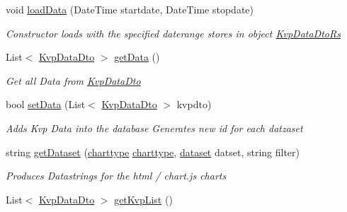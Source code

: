 \begin{DoxyCompactItemize}
void \hyperlink{classkpi_mvc_api_1_1_data_transfer_objects_1_1_kvp_data_dto_rs_afbda5e8db6a5f8b25125d2a6b6dcf7e1}{load\+Data} (Date\+Time startdate, Date\+Time stopdate)
\begin{DoxyCompactList}\small\item\em Constructor loads with the specified daterange stores in object {\ttfamily \hyperlink{classkpi_mvc_api_1_1_data_transfer_objects_1_1_kvp_data_dto_rs}{Kvp\+Data\+Dto\+Rs}} \end{DoxyCompactList}\item 
List$<$ \hyperlink{classkpi_mvc_api_1_1_data_transfer_objects_1_1_kvp_data_dto}{Kvp\+Data\+Dto} $>$ \hyperlink{classkpi_mvc_api_1_1_data_transfer_objects_1_1_kvp_data_dto_rs_a895f4b97fb8c74c1a853145c03f5d393}{get\+Data} ()
\begin{DoxyCompactList}\small\item\em Get all Data from {\ttfamily \hyperlink{classkpi_mvc_api_1_1_data_transfer_objects_1_1_kvp_data_dto}{Kvp\+Data\+Dto}} \end{DoxyCompactList}\item 
bool \hyperlink{classkpi_mvc_api_1_1_data_transfer_objects_1_1_kvp_data_dto_rs_aab05e9ab80b2e766a6744a200e4d8e91}{set\+Data} (List$<$ \hyperlink{classkpi_mvc_api_1_1_data_transfer_objects_1_1_kvp_data_dto}{Kvp\+Data\+Dto} $>$ kvpdto)
\begin{DoxyCompactList}\small\item\em Adds Kvp Data into the database Generates new id for each datzaset \end{DoxyCompactList}\item 
string \hyperlink{classkpi_mvc_api_1_1_data_transfer_objects_1_1_kvp_data_dto_rs_aded42b5e75fcbc416d4ac02875c34849}{get\+Dataset} (\hyperlink{classkpi_mvc_api_1_1_data_transfer_objects_1_1_kvp_data_dto_rs_a829c595d537885ae923de884be501246}{charttype} \hyperlink{classkpi_mvc_api_1_1_data_transfer_objects_1_1_kvp_data_dto_rs_a829c595d537885ae923de884be501246}{charttype}, \hyperlink{classkpi_mvc_api_1_1_data_transfer_objects_1_1_kvp_data_dto_rs_aec5ef29d115053aa1f78d15adc7e1373}{dataset} datset, string filter)
\begin{DoxyCompactList}\small\item\em Produces Datastrings for the html / chart.\+js charts \end{DoxyCompactList}\item 
List$<$ \hyperlink{classkpi_mvc_api_1_1_data_transfer_objects_1_1_kvp_data_dto}{Kvp\+Data\+Dto} $>$ \hyperlink{classkpi_mvc_api_1_1_data_transfer_objects_1_1_kvp_data_dto_rs_ac1bd4b0312a7a0a07b8848d9cdf739da}{get\+Kvp\+List} ()

\end{DoxyCompactItemize}
